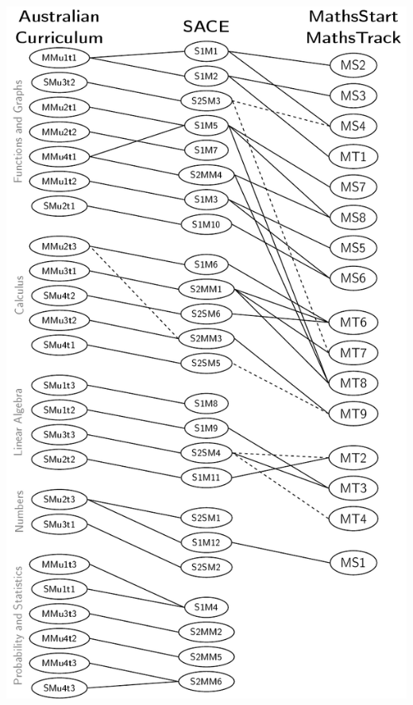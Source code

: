 \documentclass[14pt]{beamer}
\begin{document}
\begin{frame}
\begin{center}
\includegraphics[scale=0.32]{../figures/mappingByTopic.pdf}
\end{center}
\end{frame}
\end{document}
